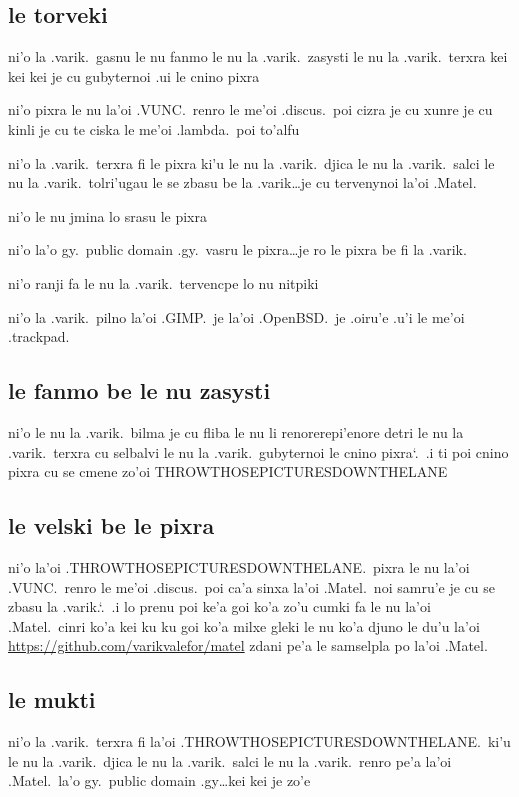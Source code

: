 \documentclass{report}
\newcommand\sds{\spacefactor\sfcode`.\ \space}
\begin{document}
\subsection{le torveki}
ni'o la .varik.\ gasnu le nu fanmo le nu la .varik.\ zasysti le nu la .varik.\ terxra kei kei kei je cu gubyternoi .ui le cnino pixra

ni'o pixra le nu la'oi .VUNC.\ renro le me'oi .discus.\ poi cizra je cu xunre je cu kinli je cu te ciska le me'oi .lambda.\ poi to'alfu

ni'o la .varik.\ terxra fi le pixra ki'u le nu la .varik.\ djica le nu la .varik.\ salci le nu la .varik.\ tolri'ugau le se zbasu be la .varik\ldots je cu tervenynoi la'oi .Matel.

ni'o le nu jmina lo srasu le pixra

ni'o la'o gy.\ public domain .gy.\ vasru le pixra\ldots je ro le pixra be fi la .varik.

ni'o ranji fa le nu la .varik.\ tervencpe lo nu nitpiki

ni'o la .varik.\ pilno la'oi .GIMP.\ je la'oi .OpenBSD.\ je .oiru'e .u'i le me'oi .trackpad.

\subsection{le fanmo be le nu zasysti}
ni'o le nu la .varik.\ bilma je cu fliba le nu li renorerepi'enore detri le nu la .varik.\ terxra cu selbalvi le nu la .varik.\ gubyternoi le cnino pixra\sds  .i ti poi cnino pixra cu se cmene zo'oi THROWTHOSEPICTURESDOWNTHELANE

\subsection{le velski be le pixra}
ni'o la'oi .THROWTHOSEPICTURESDOWNTHELANE.\ pixra le nu la'oi \linebreak  %
.VUNC.\ renro le me'oi .discus.\ poi ca'a sinxa la'oi .Matel.\ noi samru'e je cu se zbasu la .varik.\sds  .i lo prenu poi ke'a goi ko'a zo'u cumki fa le nu la'oi .Matel.\ cinri ko'a kei ku ku goi ko'a milxe gleki le nu ko'a djuno le du'u la'oi \url{https://github.com/varikvalefor/matel} zdani pe'a le samselpla po la'oi .Matel.

\subsection{le mukti}
ni'o la .varik.\ terxra fi la'oi .THROWTHOSEPICTURESDOWNTHELANE.\ ki'u le nu la .varik.\ djica le nu la .varik.\ salci le nu la .varik.\ renro pe'a la'oi .Matel.\ la'o gy.\ public domain .gy\ldots kei kei je zo'e
\end{document}
